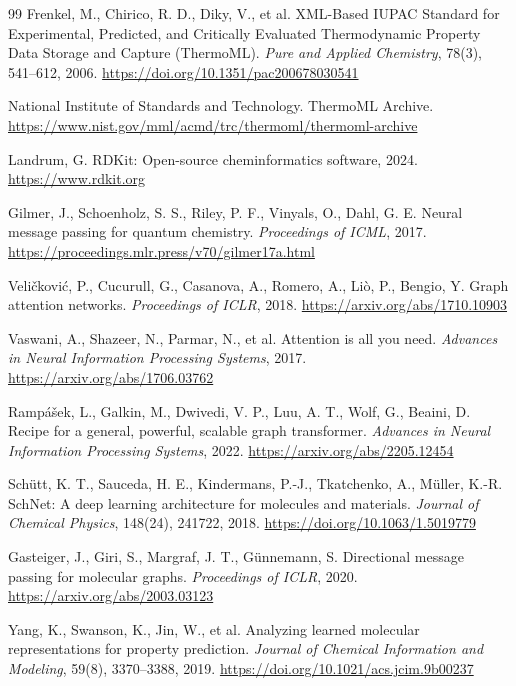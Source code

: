 \documentclass[11pt]{article}
\theoremstyle{definition}
\begin{document}
\begin{thebibliography}{99}
 Frenkel, M., Chirico, R. D., Diky, V., et al. XML-Based IUPAC Standard for Experimental, Predicted, and Critically Evaluated Thermodynamic Property Data Storage and Capture (ThermoML). \textit{Pure and Applied Chemistry}, 78(3), 541--612, 2006. \url{https://doi.org/10.1351/pac200678030541}

 National Institute of Standards and Technology. ThermoML Archive. \url{https://www.nist.gov/mml/acmd/trc/thermoml/thermoml-archive}

 Landrum, G. RDKit: Open-source cheminformatics software, 2024. \url{https://www.rdkit.org}

 Gilmer, J., Schoenholz, S. S., Riley, P. F., Vinyals, O., Dahl, G. E. Neural message passing for quantum chemistry. \textit{Proceedings of ICML}, 2017. \url{https://proceedings.mlr.press/v70/gilmer17a.html}

 Veličković, P., Cucurull, G., Casanova, A., Romero, A., Liò, P., Bengio, Y. Graph attention networks. \textit{Proceedings of ICLR}, 2018. \url{https://arxiv.org/abs/1710.10903}

 Vaswani, A., Shazeer, N., Parmar, N., et al. Attention is all you need. \textit{Advances in Neural Information Processing Systems}, 2017. \url{https://arxiv.org/abs/1706.03762}

 Rampášek, L., Galkin, M., Dwivedi, V. P., Luu, A. T., Wolf, G., Beaini, D. Recipe for a general, powerful, scalable graph transformer. \textit{Advances in Neural Information Processing Systems}, 2022. \url{https://arxiv.org/abs/2205.12454}

 Schütt, K. T., Sauceda, H. E., Kindermans, P.-J., Tkatchenko, A., Müller, K.-R. SchNet: A deep learning architecture for molecules and materials. \textit{Journal of Chemical Physics}, 148(24), 241722, 2018. \url{https://doi.org/10.1063/1.5019779}

 Gasteiger, J., Giri, S., Margraf, J. T., Günnemann, S. Directional message passing for molecular graphs. \textit{Proceedings of ICLR}, 2020. \url{https://arxiv.org/abs/2003.03123}

 Yang, K., Swanson, K., Jin, W., et al. Analyzing learned molecular representations for property prediction. \textit{Journal of Chemical Information and Modeling}, 59(8), 3370--3388, 2019. \url{https://doi.org/10.1021/acs.jcim.9b00237}


\end{thebibliography}
\end{document}
